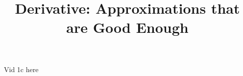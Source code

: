 \documentclass[handout]{ximera}
\title{Derivative: Approximations that are Good Enough}
\begin{document}
\begin{abstract} %
\end{abstract}

\maketitle

Vid 1c here
\end{document}
